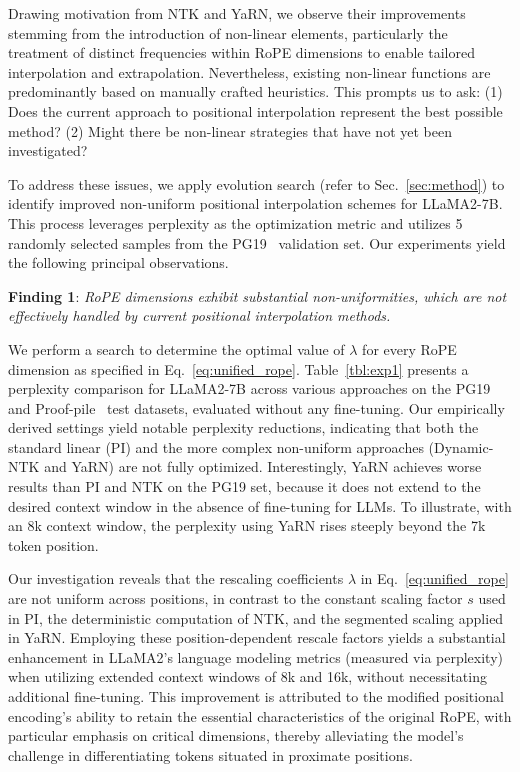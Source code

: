 Drawing motivation from NTK and YaRN, we observe their improvements stemming from the introduction of non-linear elements, particularly the treatment of distinct frequencies within RoPE dimensions to enable tailored interpolation and extrapolation. Nevertheless, existing non-linear functions are predominantly based on manually crafted heuristics. This prompts us to ask: (1) Does the current approach to positional interpolation represent the best possible method? (2) Might there be non-linear strategies that have not yet been investigated?

To address these issues, we apply evolution search (refer to Sec.~\ref{sec:method}) to identify improved non-uniform positional interpolation schemes for LLaMA2-7B. This process leverages perplexity as the optimization metric and utilizes 5 randomly selected samples from the PG19~\cite{pg19} validation set. Our experiments yield the following principal observations.

\textbf{Finding 1}: \textit{RoPE dimensions exhibit substantial non-uniformities, which are not effectively handled by current positional interpolation methods.}

We perform a search to determine the optimal value of $\lambda$ for every RoPE dimension as specified in Eq.~\ref{eq:unified_rope}. Table~\ref{tbl:exp1} presents a perplexity comparison for LLaMA2-7B across various approaches on the PG19 and Proof-pile~\cite{proof-pile} test datasets, evaluated without any fine-tuning. Our empirically derived settings yield notable perplexity reductions, indicating that both the standard linear (PI) and the more complex non-uniform approaches (Dynamic-NTK and YaRN) are not fully optimized. Interestingly, YaRN achieves worse results than PI and NTK on the PG19 set, because it does not extend to the desired context window in the absence of fine-tuning for LLMs. To illustrate, with an 8k context window, the perplexity using YaRN rises steeply beyond the 7k token position.

Our investigation reveals that the rescaling coefficients $\lambda$ in Eq.~\ref{eq:unified_rope} are not uniform across positions, in contrast to the constant scaling factor $s$ used in PI, the deterministic computation of NTK, and the segmented scaling applied in YaRN. Employing these position-dependent rescale factors yields a substantial enhancement in LLaMA2's language modeling metrics (measured via perplexity) when utilizing extended context windows of 8k and 16k, without necessitating additional fine-tuning. This improvement is attributed to the modified positional encoding's ability to retain the essential characteristics of the original RoPE, with particular emphasis on critical dimensions, thereby alleviating the model's challenge in differentiating tokens situated in proximate positions.

